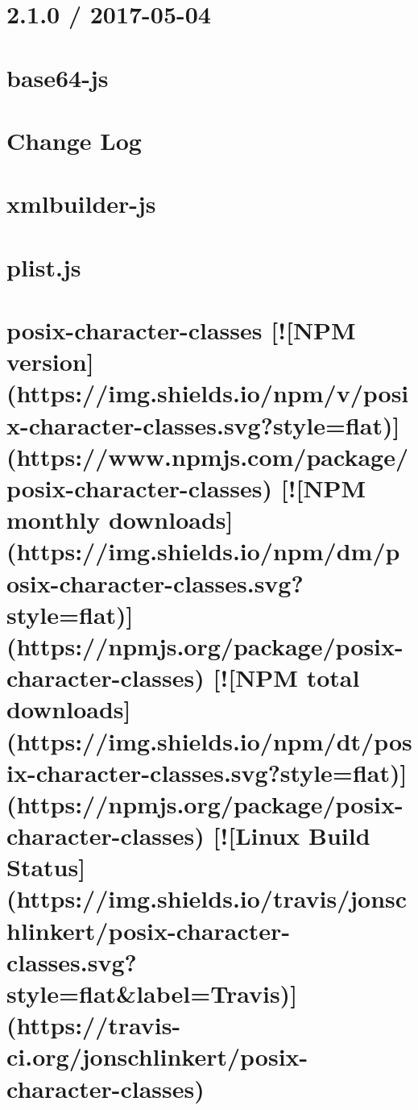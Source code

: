 \documentclass[twoside]{book}
\newcommand{\+}{\discretionary{\mbox{\scriptsize$\hookleftarrow$}}{}{}}
\begin{document}
\chapter{2.1.0 / 2017-\/05-\/04}
\label{md_dsmacc_vis_degree_node_modules_plist_History}

\chapter{base64-\/js}
\label{md_dsmacc_vis_degree_node_modules_plist_node_modules_base64-js_README}

\chapter{Change Log}
\label{md_dsmacc_vis_degree_node_modules_plist_node_modules_xmlbuilder_CHANGELOG}

\chapter{xmlbuilder-\/js}
\label{md_dsmacc_vis_degree_node_modules_plist_node_modules_xmlbuilder_README}

\chapter{plist.\+js}
\label{md_dsmacc_vis_degree_node_modules_plist_README}

\chapter{posix-\/character-\/classes \mbox{[}!\mbox{[}N\+PM version\mbox{]}(https\+://img.shields.\+io/npm/v/posix-\/character-\/classes.svg?style=flat)\mbox{]}(https\+://www.npmjs.\+com/package/posix-\/character-\/classes) \mbox{[}!\mbox{[}N\+PM monthly downloads\mbox{]}(https\+://img.shields.\+io/npm/dm/posix-\/character-\/classes.svg?style=flat)\mbox{]}(https\+://npmjs.org/package/posix-\/character-\/classes) \mbox{[}!\mbox{[}N\+PM total downloads\mbox{]}(https\+://img.shields.\+io/npm/dt/posix-\/character-\/classes.svg?style=flat)\mbox{]}(https\+://npmjs.org/package/posix-\/character-\/classes) \mbox{[}!\mbox{[}Linux Build Status\mbox{]}(https\+://img.shields.\+io/travis/jonschlinkert/posix-\/character-\/classes.svg?style=flat\&label=Travis)\mbox{]}(https\+://travis-\/ci.org/jonschlinkert/posix-\/character-\/classes)}
\label{md_dsmacc_vis_degree_node_modules_posix-character-classes_README}

\end{document}
